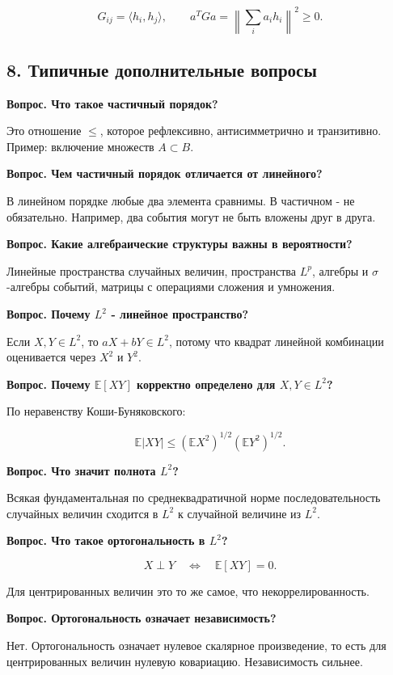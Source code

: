 \documentclass[
  11pt,
  a4paper,
]{article}
\begin{document}
\[
G_{ij}=\langle h_i,h_j\rangle,
\qquad
a^TGa=\left\|\sum_i a_ih_i\right\|^2\ge0.
\]

\subsection{8. Типичные дополнительные
вопросы}\label{ux442ux438ux43fux438ux447ux43dux44bux435-ux434ux43eux43fux43eux43bux43dux438ux442ux435ux43bux44cux43dux44bux435-ux432ux43eux43fux440ux43eux441ux44b}

\textbf{Вопрос. Что такое частичный порядок?}

Это отношение \(\le\), которое рефлексивно, антисимметрично и
транзитивно. Пример: включение множеств \(A\subset B\).

\textbf{Вопрос. Чем частичный порядок отличается от линейного?}

В линейном порядке любые два элемента сравнимы. В частичном - не
обязательно. Например, два события могут не быть вложены друг в друга.

\textbf{Вопрос. Какие алгебраические структуры важны в вероятности?}

Линейные пространства случайных величин, пространства \(L^p\), алгебры и
\(\sigma\)-алгебры событий, матрицы с операциями сложения и умножения.

\textbf{Вопрос. Почему \(L^2\) - линейное пространство?}

Если \(X,Y\in L^2\), то \(aX+bY\in L^2\), потому что квадрат линейной
комбинации оценивается через \(X^2\) и \(Y^2\).

\textbf{Вопрос. Почему \(\mathbb E[XY]\) корректно определено для
\(X,Y\in L^2\)?}

По неравенству Коши-Буняковского:

\[
\mathbb E|XY|\le(\mathbb EX^2)^{1/2}(\mathbb EY^2)^{1/2}.
\]

\textbf{Вопрос. Что значит полнота \(L^2\)?}

Всякая фундаментальная по среднеквадратичной норме последовательность
случайных величин сходится в \(L^2\) к случайной величине из \(L^2\).

\textbf{Вопрос. Что такое ортогональность в \(L^2\)?}

\[
X\perp Y
\quad\Longleftrightarrow\quad
\mathbb E[XY]=0.
\]

Для центрированных величин это то же самое, что некоррелированность.

\textbf{Вопрос. Ортогональность означает независимость?}

Нет. Ортогональность означает нулевое скалярное произведение, то есть
для центрированных величин нулевую ковариацию. Независимость сильнее.
\end{document}
